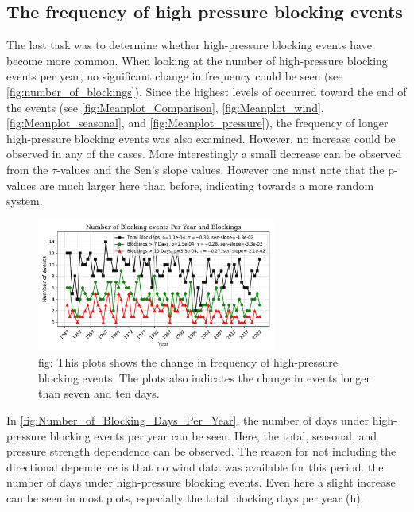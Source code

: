 \subsection{The frequency of high pressure blocking events}
The last task was to determine whether high-pressure blocking events have become more common. When looking at the number of high-pressure blocking events per year, no significant change in frequency could be seen (see \autoref{fig:number_of_blockings}). Since the highest levels of \PM  occurred toward the end of the events (see \autoref{fig:Meanplot_Comparison}, \autoref{fig:Meanplot_wind}, \autoref{fig:Meanplot_seasonal}, and \autoref{fig:Meanplot_pressure}), the frequency of longer high-pressure blocking events was also examined. However, no increase could be observed in any of the cases. More interestingly a small decrease can be observed from the $\tau$-values and the Sen's slope values. However one must note that the p-values are much larger here than before, indicating towards a more random system. 

\begin{figure}[H]
    \centering
    \includegraphics[width=0.7\textwidth]{Figures/BlockingsPerYear.pdf}
    \caption{fig: This plots shows the change in frequency of high-pressure blocking events. The plots also indicates the change in events longer than seven and ten days. }
    \label{fig:number_of_blockings}
\end{figure}

In \autoref{fig:Number_of_Blocking_Days_Per_Year}, the number of days under high-pressure blocking events per year can be seen. Here, the total, seasonal, and pressure strength dependence can be observed. The reason for not including the directional dependence is that no wind data was available for this period. the number of days under high-pressure blocking events. Even here a slight increase can be seen in most plots, especially the total blocking days per year (h). 


